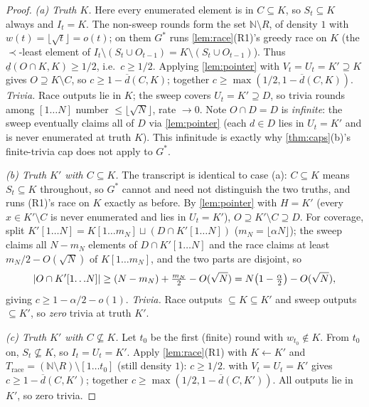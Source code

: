 \documentclass[11pt]{article}
\numberwithin{equation}{section}
\newcommand{\N}{\mathbb{N}}
\DeclarePairedDelimiter{\abs}{\lvert}{\rvert}
\newcommand{\Val}{H}
\newcommand{\Seen}{S}
\newcommand{\Out}{O}
\newcommand{\Core}{C}
\newcommand{\dlow}[2]{\underline{d}(#1,#2)}
\newcommand{\dup}[2]{\overline{d}(#1,#2)}
\newcommand{\cov}{c}
\newcommand{\rest}[2]{#1[1\!\dots\! #2]}
\theoremstyle{plain}
\theoremstyle{definition}
\theoremstyle{remark}
\begin{document}
\begin{proof}
\emph{(a) Truth $K$.} Here every enumerated element is in $\Core \subseteq K$, so $\Seen_t
\subseteq K$ always and $I_t = K$. The non-sweep rounds form the set $\N \setminus R$, of
density $1$ with $w(t) = \lfloor \sqrt t \rfloor = o(t)$; on them $G^*$ runs
\cref{lem:race}(R1)'s greedy race on $K$ (the $\prec$-least element of $I_t \setminus (\Seen_t
\cup \Out_{t-1}) = K \setminus (\Seen_t \cup \Out_{t-1})$). Thus $\dlow{\Out \cap K}{K} \ge
1/2$, i.e.\ $\cov \ge 1/2$. Applying \cref{lem:pointer} with $V_t = U_t = K' \supseteq K$
gives $\Out \supseteq K \setminus \Core$, so $\cov \ge 1 - \dup{\Core}{K}$; together $\cov \ge
\max(1/2, 1 - \dup{\Core}{K})$. \emph{Trivia.} Race outputs lie in $K$; the sweep covers $U_t
= K' \supseteq D$, so trivia rounds among $[1\dots N]$ number $\le \lfloor \sqrt N \rfloor$,
rate $\to 0$. Note $\Out \cap D = D$ is \emph{infinite}: the sweep eventually claims all of
$D$ via \cref{lem:pointer} (each $d \in D$ lies in $U_t = K'$ and is never enumerated at truth
$K$). This infinitude is exactly why \cref{thm:caps}(b)'s finite-trivia cap does not apply to
$G^*$.

\emph{(b) Truth $K'$ with $\Core \subseteq K$.} The transcript is identical to case (a):
$\Core \subseteq K$ means $\Seen_t \subseteq K$ throughout, so $G^*$ cannot and need not
distinguish the two truths, and runs (R1)'s race on $K$ exactly as before. By
\cref{lem:pointer} with $\Val = K'$ (every $x \in K' \setminus \Core$ is never enumerated and
lies in $U_t = K'$), $\Out \supseteq K' \setminus \Core \supseteq D$. For coverage, split
$\rest{K'}{N} = \rest{K}{m_N} \sqcup (D \cap \rest{K'}{N})$ ($m_N = \lfloor \alpha N
\rfloor$); the sweep claims all $N - m_N$ elements of $D \cap \rest{K'}{N}$ and the race
claims at least $m_N/2 - O(\sqrt N)$ of $\rest{K}{m_N}$, and the two parts are disjoint, so
\begin{equation*}
  \abs{\Out \cap \rest{K'}{N}} \ge (N - m_N) + \tfrac{m_N}{2} - O(\sqrt N)
  = N\bigl(1 - \tfrac{\alpha}{2}\bigr) - O(\sqrt N),
\end{equation*}
giving $\cov \ge 1 - \alpha/2 - o(1)$. \emph{Trivia.} Race outputs $\subseteq K \subseteq K'$
and sweep outputs $\subseteq K'$, so \emph{zero} trivia at truth $K'$.

\emph{(c) Truth $K'$ with $\Core \not\subseteq K$.} Let $t_0$ be the first (finite) round with
$w_{t_0} \notin K$. From $t_0$ on, $\Seen_t \not\subseteq K$, so $I_t = U_t = K'$. Apply
\cref{lem:race}(R1) with $K \leftarrow K'$ and $T_{\mathrm{race}} = (\N \setminus R) \setminus
[1\dots t_0]$ (still density $1$): $\cov \ge 1/2$.  with $V_t = U_t = K'$
gives $\cov \ge 1 - \dup{\Core}{K'}$; together $\cov \ge \max(1/2, 1 - \dup{\Core}{K'})$. All
outputs lie in $K'$, so zero trivia.


\end{proof}
\end{document}
